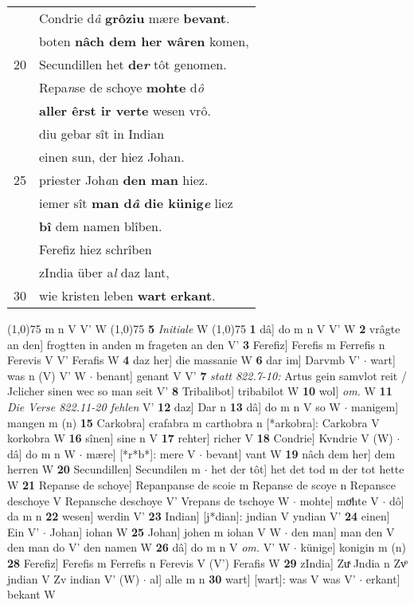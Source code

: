 \documentclass[8pt,a4paper,notitlepage]{article}
\begin{document}
\begin{table}[ht]
\begin{minipage}[t]{0.5\linewidth}
\begin{tabular}{rl}
 & Condrie d\textit{â} \textbf{grôziu} mære \textbf{bevant}.\\ 
 & boten \textbf{nâch dem her wâren} komen,\\ 
20 & Secundillen het \textbf{de\textit{r}} tôt genomen.\\ 
 & Repa\textit{n}se de schoye \textbf{mohte} d\textit{ô}\\ 
 & \textbf{aller êrst ir verte} wesen vrô.\\ 
 & diu gebar sît in Indian\\ 
 & einen sun, der hiez Johan.\\ 
25 & priester Joh\textit{a}n \textbf{den man} hiez.\\ 
 & iemer sît \textbf{man d\textit{â} die künig\textit{e}} liez\\ 
 & \textbf{bî} dem namen blîben.\\ 
 & Ferefiz hiez schrîben\\ 
 & zIndia über a\textit{l} daz lant,\\ 
30 & wie kristen leben \textbf{wart} \textbf{erkant}.\\ 
\end{tabular}
\scriptsize
\line(1,0){75} \newline
m n V V' W \newline
\line(1,0){75} \newline
\textbf{5} \textit{Initiale} W  \newline
\line(1,0){75} \newline
\textbf{1} dâ] do m n V V' W \textbf{2} vrâgte an den] frogtten in anden m frageten an den V' \textbf{3} Ferefiz] Ferefis m Ferrefis n Ferevis V V' Ferafis W \textbf{4} daz her] die massanie W \textbf{6} dar im] Darvmb V'  $\cdot$ wart] was n (V) V' W  $\cdot$ benant] genant V V' \textbf{7} \textit{statt 822.7-10:} Artus gein samvlot reit / Jclicher sinen wec so man seit V'  \textbf{8} Tribalibot] tribabilot W \textbf{10} wol] \textit{om.} W \textbf{11} \textit{Die Verse 822.11-20 fehlen} V'  \textbf{12} daz] Dar n \textbf{13} dâ] do m n V so W  $\cdot$ manigem] mangen m (n) \textbf{15} Carkobra] crafabra m carthobra n [*arkobra]: Carkobra V korkobra W \textbf{16} sînen] sine n V \textbf{17} rehter] richer V \textbf{18} Condrie] Kvndrie V (W)  $\cdot$ dâ] do m n W  $\cdot$ mære] [*r*b*]: mere V  $\cdot$ bevant] vant W \textbf{19} nâch dem her] dem herren W \textbf{20} Secundillen] Secundilen m  $\cdot$ het der tôt] het det tod m der tot hette W \textbf{21} Repanse de schoye] Repanpanse de scoie m Repanse de scoye n Repansce deschoye V Repansche deschoye V' Vrepans de tschoye W  $\cdot$ mohte] moͤhte V  $\cdot$ dô] da m n \textbf{22} wesen] werdin V' \textbf{23} Indian] [j*dian]: jndian V yndian V' \textbf{24} einen] Ein V'  $\cdot$ Johan] iohan W \textbf{25} Johan] johen m iohan V W  $\cdot$ den man] man den V den man do V' den namen W \textbf{26} dâ] do m n V \textit{om.} V' W  $\cdot$ künige] konigin m (n) \textbf{28} Ferefiz] Ferefis m Ferrefis n Ferevis V (V') Ferafis W \textbf{29} zIndia] Zuͯ Jndia n Zvͦ jndian V Zv indian V' (W)  $\cdot$ al] alle m n \textbf{30} wart] [wart]: was V was V'  $\cdot$ erkant] bekant W \newline

\end{minipage}
\end{table}
\end{document}
